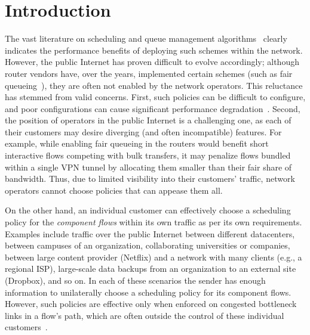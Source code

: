 \section{Introduction}\label{s:intro}



The vast literature on scheduling and queue management algorithms~\cite{diffserv, fair-queueing, sfq, pie, CoDel, fifoplus, virtualClocks, csfq, drr, red, ecn} clearly indicates the performance benefits of deploying such schemes within the network. However, the public Internet has proven difficult to evolve accordingly; although router vendors have, over the years, implemented certain schemes (such as fair queueing~\cite{fair-queueing}), they are often not enabled by the network operators. 
This reluctance has stemmed from valid concerns. First, such policies can be difficult to configure, and poor configurations can cause significant performance degradation~\cite{nanog-discussion}. Second, the position of operators in the public Internet is a challenging one, as each of their customers may desire diverging (and often incompatible) features. For example, while enabling fair queueing in the routers would benefit short interactive flows competing with bulk transfers, it may penalize flows bundled within a single VPN tunnel by allocating them smaller than their fair share of bandwidth.
Thus, due to limited visibility into their customers' traffic, network operators cannot choose policies that can appease them all. 

On the other hand, an individual customer can effectively choose a scheduling policy for the \emph{component flows} within its own traffic as per its own requirements. 
Examples include traffic over the public Internet between different datacenters, between campuses of an organization, collaborating universities or companies, between large content provider (\eg Netflix) and a network with many clients (e.g., a regional ISP), large-scale data backups from an organization to an external site (\eg Dropbox), and so on. 
In each of these scenarios the sender has enough information to unilaterally choose a scheduling policy for its component flows. However, such policies are effective only when enforced on congested bottleneck links in a flow's path, which are often outside the control of these individual customers~\cite{inferring-interdomain-congestion}. 

